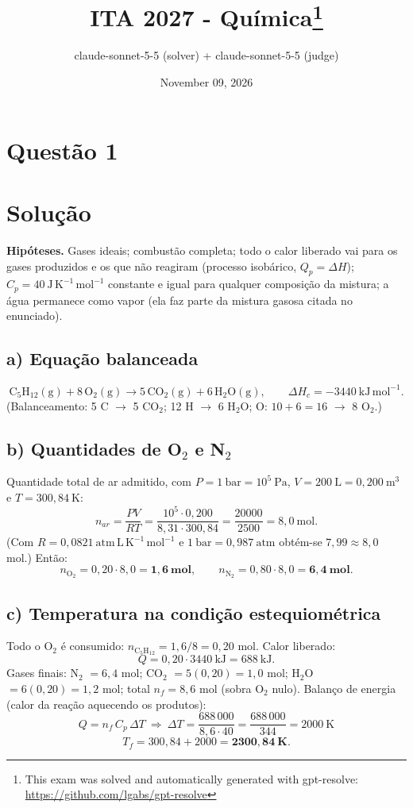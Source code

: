\documentclass{article}%
\title{ITA 2027 - Química\thanks{This exam was solved and automatically generated with gpt-resolve: \url{https://github.com/lgabs/gpt-resolve}}}%
\author{claude{-}sonnet{-}5{-}5 (solver) + claude{-}sonnet{-}5{-}5 (judge)}%
\date{November 09, 2026}%
\begin{document}
%
\normalsize%
\maketitle%
\section*{Questão 1}

\section*{Solução}

\textbf{Hipóteses.} Gases ideais; combustão completa; todo o calor liberado vai para os gases produzidos e os que não reagiram (processo isobárico, $Q_p=\Delta H$); $C_p=40\ \mathrm{J\,K^{-1}\,mol^{-1}}$ constante e igual para qualquer composição da mistura; a água permanece como vapor (ela faz parte da mistura gasosa citada no enunciado).

\subsection*{a) Equação balanceada}
\[
\mathrm{C_5H_{12}(g)} + 8\,\mathrm{O_2(g)} \longrightarrow 5\,\mathrm{CO_2(g)} + 6\,\mathrm{H_2O(g)},\qquad \Delta H_c=-3440\ \mathrm{kJ\,mol^{-1}} .
\]
(Balanceamento: 5 C $\to$ 5 CO$_2$; 12 H $\to$ 6 H$_2$O; O: $10+6=16$ $\to$ 8 O$_2$.)

\subsection*{b) Quantidades de O$_2$ e N$_2$}
Quantidade total de ar admitido, com $P=1\ \mathrm{bar}=10^{5}\ \mathrm{Pa}$, $V=200\ \mathrm{L}=0{,}200\ \mathrm{m^3}$ e $T=300{,}84\ \mathrm{K}$:
\[
n_{ar}=\frac{PV}{RT}=\frac{10^{5}\cdot 0{,}200}{8{,}31\cdot 300{,}84}=\frac{20000}{2500}=8{,}0\ \mathrm{mol}.
\]
(Com $R=0{,}0821\ \mathrm{atm\,L\,K^{-1}\,mol^{-1}}$ e $1\ \mathrm{bar}=0{,}987\ \mathrm{atm}$ obtém-se $7{,}99\approx 8{,}0$ mol.) Então:
\[
n_{\mathrm{O_2}}=0{,}20\cdot 8{,}0=\mathbf{1{,}6\ mol},\qquad n_{\mathrm{N_2}}=0{,}80\cdot 8{,}0=\mathbf{6{,}4\ mol}.
\]

\subsection*{c) Temperatura na condição estequiométrica}
Todo o O$_2$ é consumido: $n_{\mathrm{C_5H_{12}}}=1{,}6/8=0{,}20$ mol. Calor liberado:
\[
Q=0{,}20\cdot 3440\ \mathrm{kJ}=688\ \mathrm{kJ}.
\]
Gases finais: N$_2$ $=6{,}4$ mol; CO$_2$ $=5(0{,}20)=1{,}0$ mol; H$_2$O $=6(0{,}20)=1{,}2$ mol; total $n_f=8{,}6$ mol (sobra O$_2$ nulo). Balanço de energia (calor da reação aquecendo os produtos):
\[
Q=n_f\,C_p\,\Delta T\ \Rightarrow\ \Delta T=\frac{688\,000}{8{,}6\cdot 40}=\frac{688\,000}{344}=2000\ \mathrm{K}
\]
\[
T_f=300{,}84+2000=\mathbf{2300{,}84\ K}.
\]
\end{document}
